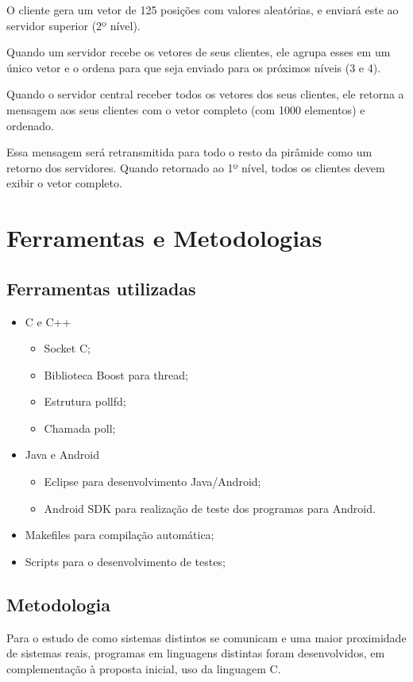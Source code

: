 \documentclass[12pt,a4paper]{article}
\begin{document}
O cliente gera um vetor de 125 posições com valores aleatórias, e enviará este ao servidor superior (2º nível).

Quando um servidor recebe os vetores de seus clientes, ele agrupa esses em um único vetor e o ordena para que seja enviado para os próximos níveis (3 e 4).

Quando o servidor central receber todos os vetores dos seus clientes, ele retorna a mensagem aos seus clientes com o vetor completo (com 1000 elementos) e ordenado. 

Essa mensagem será retransmitida para todo o resto da pirâmide como um retorno dos servidores. Quando retornado ao 1º nível, todos os clientes devem exibir o vetor completo.

\newpage
\section{Ferramentas e Metodologias}
\subsection{Ferramentas utilizadas}
\begin{itemize}
\item C e C++
	\begin{itemize}
	\item Socket C;
	\item Biblioteca Boost para thread;
	\item Estrutura pollfd;
	\item Chamada poll;
	\end{itemize}
\item Java e Android        
	\begin{itemize}
	\item Eclipse para desenvolvimento Java/Android;
	\item Android SDK para realização de teste dos programas para Android. 
	\end{itemize}
\item Makefiles para compilação automática;
\item Scripts para o desenvolvimento de testes;
\end{itemize}

\subsection{Metodologia}
Para o estudo de como sistemas distintos se comunicam e uma maior proximidade de sistemas reais, programas em linguagens distintas foram desenvolvidos, em complementação à proposta inicial, uso da linguagem C.
\end{document}
